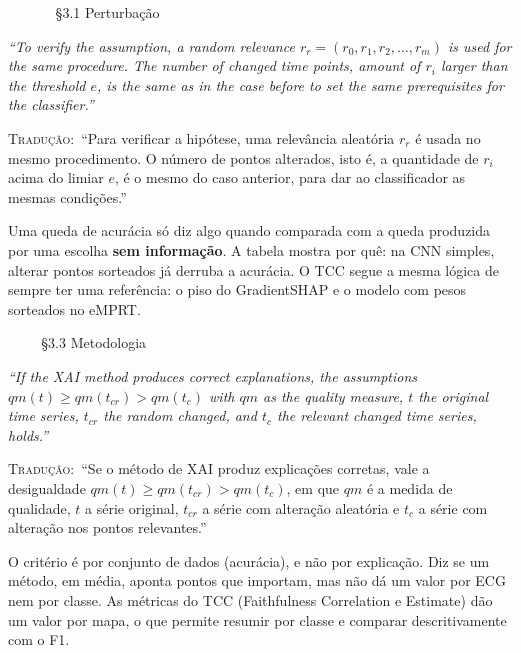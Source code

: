 \documentclass[11pt,a4paper]{article}
\newcommand{\pagechip}[1]{{\setlength{\fboxsep}{1.5pt}\colorbox{cAcc}{\textcolor{white}{\scriptsize\texttt{#1}}}}}
\newenvironment{origquote}{\par\itshape\small}{\par}
\newenvironment{tradquote}{\par\small\textsc{Tradução:}\ }{\par}
\newcommand{\explab}[1]{\par\smallskip{\small\color{cAcc}\textbf{\MakeUppercase{#1}}}\par}
\begin{document}
\begin{citacard}{\pagechip{p. 2--3} §3.1 Perturbação}
\begin{origquote}“To verify the assumption, a random relevance $r_r = (r_0, r_1, r_2, \dots, r_m)$ is used for the same procedure. The number of changed time points, amount of $r_i$ larger than the threshold $e$, is the same as in the case before to set the same prerequisites for the classifier.”\end{origquote}
\begin{tradquote}“Para verificar a hipótese, uma relevância aleatória $r_r$ é usada no mesmo procedimento. O número de pontos alterados, isto é, a quantidade de $r_i$ acima do limiar $e$, é o mesmo do caso anterior, para dar ao classificador as mesmas condições.”\end{tradquote}
\explab{Explicação}
Uma queda de acurácia só diz algo quando comparada com a queda produzida por uma escolha \textbf{sem informação}. A tabela mostra por quê: na CNN simples, alterar pontos sorteados já derruba a acurácia. O TCC segue a mesma lógica de sempre ter uma referência: o piso do GradientSHAP e o modelo com pesos sorteados no eMPRT.
\end{citacard}

\begin{citacard}{\pagechip{p. 3} §3.3 Metodologia}
\begin{origquote}“If the XAI method produces correct explanations, the assumptions $qm(t) \geq qm(t_{cr}) > qm(t_c)$ with $qm$ as the quality measure, $t$ the original time series, $t_{cr}$ the random changed, and $t_c$ the relevant changed time series, holds.”\end{origquote}
\begin{tradquote}“Se o método de XAI produz explicações corretas, vale a desigualdade $qm(t) \geq qm(t_{cr}) > qm(t_c)$, em que $qm$ é a medida de qualidade, $t$ a série original, $t_{cr}$ a série com alteração aleatória e $t_c$ a série com alteração nos pontos relevantes.”\end{tradquote}
\explab{Explicação}
O critério é por conjunto de dados (acurácia), e não por explicação. Diz se um método, em média, aponta pontos que importam, mas não dá um valor por ECG nem por classe. As métricas do TCC (Faithfulness Correlation e Estimate) dão um valor por mapa, o que permite resumir por classe e comparar descritivamente com o F1.
\end{citacard}
\end{document}
